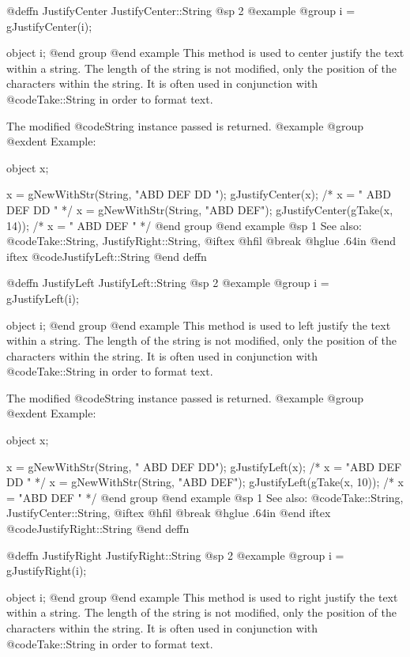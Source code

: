 @deffn {JustifyCenter} JustifyCenter::String
@sp 2
@example
@group
i = gJustifyCenter(i);

object  i;
@end group
@end example
This method is used to center justify the text within a string.  The length
of the string is not modified, only the position of the characters within
the string.  It is often used in conjunction with @code{Take::String} in
order to format text.

The modified @code{String} instance passed is returned.
@example
@group
@exdent Example:

object  x;

x = gNewWithStr(String, "ABD  DEF  DD      ");
gJustifyCenter(x);   /*  x = "   ABD  DEF  DD   "    */
x = gNewWithStr(String, "ABD  DEF");
gJustifyCenter(gTake(x, 14));   /*  x = "   ABD  DEF   "    */
@end group
@end example
@sp 1
See also:  @code{Take::String, JustifyRight::String,}
@iftex
@hfil @break @hglue .64in       
@end iftex
@code{JustifyLeft::String}
@end deffn






@deffn {JustifyLeft} JustifyLeft::String
@sp 2
@example
@group
i = gJustifyLeft(i);

object  i;
@end group
@end example
This method is used to left justify the text within a string.  The length
of the string is not modified, only the position of the characters within
the string.  It is often used in conjunction with @code{Take::String} in
order to format text.

The modified @code{String} instance passed is returned.
@example
@group
@exdent Example:

object  x;

x = gNewWithStr(String, "    ABD  DEF  DD");
gJustifyLeft(x);   /*  x = "ABD  DEF  DD    "    */
x = gNewWithStr(String, "ABD  DEF");
gJustifyLeft(gTake(x, 10));   /*  x = "ABD  DEF  "    */
@end group
@end example
@sp 1
See also:  @code{Take::String, JustifyCenter::String,}
@iftex
@hfil @break @hglue .64in       
@end iftex
@code{JustifyRight::String}
@end deffn











@deffn {JustifyRight} JustifyRight::String
@sp 2
@example
@group
i = gJustifyRight(i);

object  i;
@end group
@end example
This method is used to right justify the text within a string.  The length
of the string is not modified, only the position of the characters within
the string.  It is often used in conjunction with @code{Take::String} in
order to format text.

